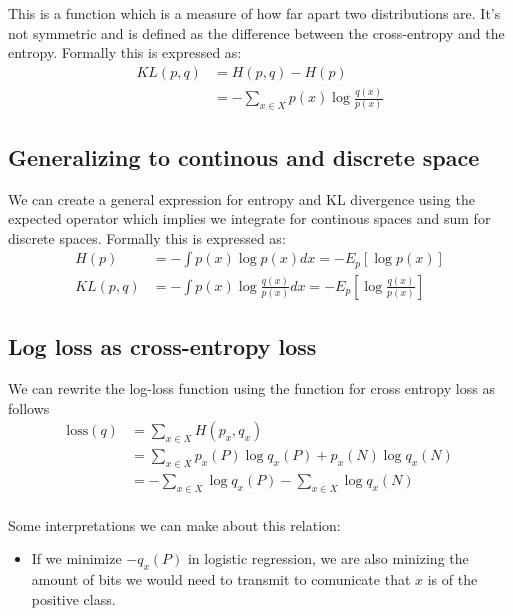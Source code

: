 \documentclass[12pt]{article}
\begin{document}
\begin{definition}[KL divergence]
    This is a function which is a measure of how far apart two distributions are. It's not symmetric and is defined as the difference between the cross-entropy and the entropy. Formally this is expressed as:
    \begin{align*}
        KL(p, q) & = H(p, q) - H(p) \\
        & = -\sum_{x\in X} p(x)\log \frac{q(x)}{p(x)}
    \end{align*}
\end{definition}

\subsection{Generalizing to continous and discrete space}

We can create a general expression for entropy and KL divergence using the expected operator which implies we integrate for continous spaces and sum for discrete spaces. Formally this is expressed as:
\begin{align*}
    H(p) & = -\int p(x)\log p(x)dx = -E_p[\log p(x)] \\
    KL(p, q) & = -\int p(x)\log \frac{q(x)}{p(x)}dx = -E_p[\log \frac{q(x)}{p(x)}]
\end{align*}

\subsection{Log loss as cross-entropy loss}

We can rewrite the log-loss function using the function for cross entropy loss as follows 
\begin{align*}
    \text{loss}(q) & = \sum_{x\in X}H(p_x, q_x) \\ 
    & = \sum_{x\in X} p_x(P)\log q_x(P) + p_x(N)\log q_x(N) \\
    & = -\sum_{x\in X} \log q_x(P) - \sum_{x\in X}\log q_x(N) \\
\end{align*}

Some interpretations we can make about this relation: 
\begin{itemize}[leftmargin=*, noitemsep]
    \item If we minimize $-q_x(P)$ in logistic regression, we are also minizing the amount of bits we would need to transmit to comunicate that $x$ is of the positive class.
\end{itemize}
\end{document}
